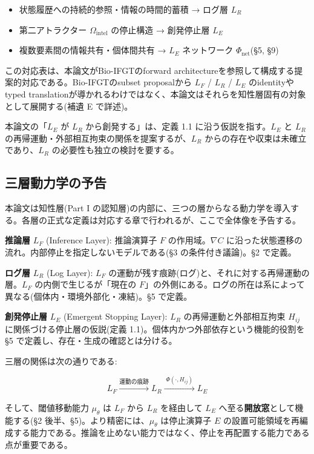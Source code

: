 \begin{itemize}
\item 状態履歴への持続的参照・情報の時間的蓄積 → ログ層 $L_R$
\item 第二アトラクター $\Omega_{\text{intel}}$ の停止構造 → 創発停止層 $L_E$
\item 複数要素間の情報共有・個体間共有 → $L_E$ ネットワーク $\Phi_{\text{net}}$(\S{}5, \S{}9)
\end{itemize}


この対応表は、本論文がBio-IFGTのforward architectureを参照して構成する提案的対応である。Bio-IFGTのsubset proposalから $L_F$ / $L_R$ / $L_E$ のidentityやtyped translationが導かれるわけではなく、本論文はそれらを知性層固有の対象として展開する(補遺 E で詳述)。

本論文の「$L_E$ が $L_R$ から創発する」は、定義 1.1 に沿う仮説を指す。$L_E$ と $L_R$ の再帰運動・外部相互拘束の関係を提案するが、$L_R$ からの存在や収束は未確立であり、$L_R$ の必要性も独立の検討を要する。

\bigskip


\subsection{三層動力学の予告}


本論文は知性層(Part I の認知層)の内部に、三つの層からなる動力学を導入する。各層の正式な定義は対応する章で行われるが、ここで全体像を予告する。

\textbf{推論層} $L_F$ (Inference Layer):
推論演算子 $F$ の作用域。$\nabla C$ に沿った状態遷移の流れ。内部停止を指定しないモデルである(\S{}3 の条件付き議論)。\S{}2 で定義。

\textbf{ログ層} $L_R$ (Log Layer):
$L_F$ の運動が残す痕跡(ログ)と、それに対する再帰運動の層。$L_F$ の内側で生じるが「現在の $F$」の外側にある。ログの所在は系によって異なる(個体内・環境外部化・凍結)。\S{}5 で定義。

\textbf{創発停止層} $L_E$ (Emergent Stopping Layer):
$L_R$ の再帰運動と外部相互拘束 $H_{ij}$ に関係づける停止層の仮説(定義 1.1)。個体内かつ外部依存という機能的役割を \S{}5 で定義し、存在・生成の確認とは分ける。

三層の関係は次の通りである:

\[
L_F \xrightarrow{\text{運動の痕跡}} L_R \xrightarrow{\;\Phi(\cdot, H_{ij})\;} L_E
\]

そして、閾値移動能力 $\mu_\theta$ は $L_F$ から $L_R$ を経由して $L_E$ へ至る\textbf{開放窓}として機能する(\S{}2 後半、\S{}5)。より精密には、$\mu_\theta$ は停止演算子 $E$ の設置可能領域を再編成する能力である。推論を止めない能力ではなく、停止を再配置する能力である点が重要である。

